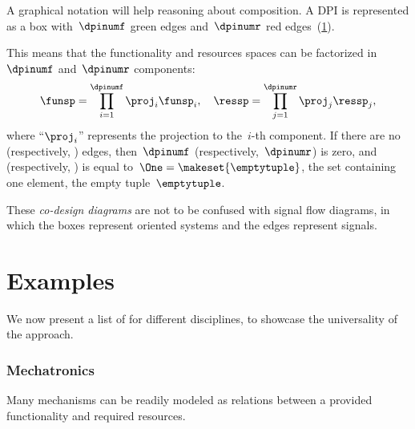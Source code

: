A graphical notation will help reasoning about composition.
A DPI is represented as a box with~$\dpinumf$ green edges and~$\dpinumr$ red edges~(\cref{fig:dp_graphical}).

\begin{figure}[h!]
    \centering
    \caption{}
    \label{fig:dp_graphical}
\end{figure}


This means that the functionality and resources spaces can be factorized in~$\dpinumf$ and~$\dpinumr$ components:
\begin{equation}
    \funsp=\prod_{i=1}^{\dpinumf}\proj_i\funsp_{i},\quad \ressp=\prod_{j=1}^{\dpinumr}\proj_{j}\ressp_{j},
\end{equation}
where ``$\proj_{i}$'' represents the projection to the~$i$-th component.
If there are no  (respectively, ) edges, then~$\dpinumf$ (respectively,~$\dpinumr$) is zero, and \funsp (respectively, \ressp) is equal to~$\One=\makeset{\emptytuple }$, the set containing one element, the empty tuple~$\emptytuple$.

These \emph{co-design diagrams} are not to be confused with signal flow diagrams, in which the boxes represent oriented systems and the edges represent signals.



\section{Examples}
We now present a list of  for different disciplines, to showcase the universality of the approach.

\subsubsection{Mechatronics}
Many mechanisms can be readily modeled as relations between a provided functionality and required resources.


